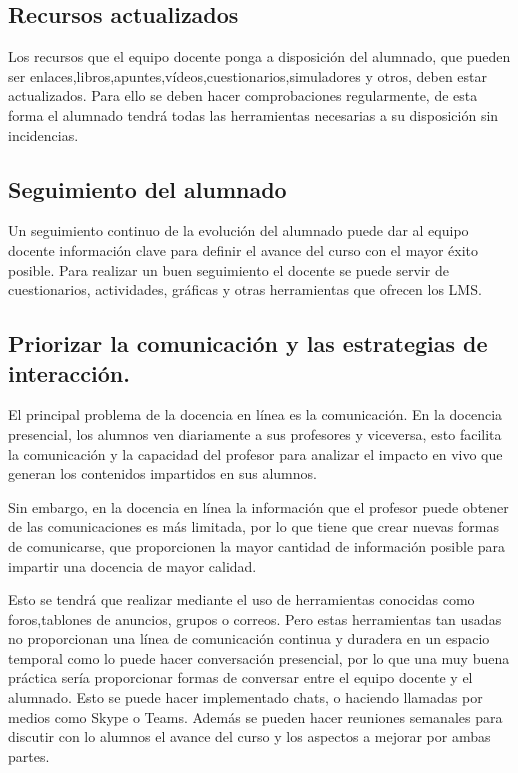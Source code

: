 \subsection{Recursos actualizados}
Los recursos que el equipo docente ponga a disposición del alumnado, que pueden ser enlaces,libros,apuntes,vídeos,cuestionarios,simuladores y otros, deben estar actualizados. Para ello se deben hacer comprobaciones regularmente, de esta forma el alumnado tendrá todas las herramientas necesarias a su disposición sin incidencias. 
\subsection{Seguimiento del alumnado}
Un seguimiento continuo de la evolución del alumnado puede dar al equipo docente información clave para definir el avance del curso con el mayor éxito posible. Para realizar un buen seguimiento el docente se puede servir de cuestionarios, actividades, gráficas y otras herramientas que ofrecen los LMS.
\subsection{Priorizar la comunicación y las estrategias de interacción.}
El principal problema de la docencia en línea es la comunicación. En la docencia presencial, los alumnos ven diariamente a sus profesores y viceversa, esto facilita la comunicación y la capacidad del profesor para analizar el impacto en vivo que generan los contenidos impartidos en sus alumnos. 

Sin embargo, en la docencia en línea la información que el profesor puede obtener de las comunicaciones es más limitada, por lo que tiene que crear nuevas formas de comunicarse, que proporcionen la mayor cantidad de información posible para impartir una docencia de mayor calidad. 

Esto se tendrá que realizar mediante el uso de herramientas conocidas como foros,tablones de anuncios, grupos o correos. Pero estas herramientas tan usadas no proporcionan una línea de comunicación continua y duradera en un espacio temporal como lo puede hacer conversación presencial, por lo que una muy buena práctica sería proporcionar formas de conversar entre el equipo docente y el alumnado. Esto se puede hacer implementado chats, o haciendo llamadas por medios como Skype o Teams. Además se pueden hacer reuniones semanales para discutir con lo alumnos el avance del curso y los aspectos a mejorar por ambas partes.


